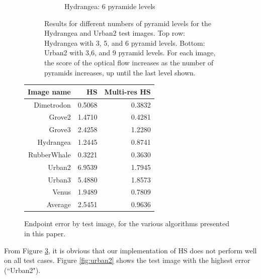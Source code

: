 \documentclass[10pt,twocolumn,letterpaper]{article}
\begin{document}
\begin{figure}
\begin{figure}[t]
\begin{subfigure}[b]{0.3\textwidth}
		\caption{Hydrangea: 6 pyramide levels}
		\label{fig:hydrangea6}
	\end{subfigure}
	\caption{Results for different numbers of pyramid levels for the Hydrangea and Urban2 test images.  Top row: Hydrangea with 3, 5, and 6 pyramid levels.  Bottom: Urban2 with 3,6, and 9 pyramid levels. For each image, the score of the optical flow increases as the number of pyramids increases, up until the last level shown. }
	\label{fig:multires}
\end{figure}

\begin{tabular} {|r | r | r|}
\hline
Image name & HS & Multi-res HS \\
\hline 
Dimetrodon & 0.5068 &  0.3832 \\
Grove2 & 1.4710 & 0.4281 \\
Grove3 &  2.4258 & 1.2280 \\
Hydrangea & 1.2445 & 0.8741 \\
RubberWhale & 0.3221 & 0.3630 \\
Urban2 & 6.9539 & 1.7945 \\
Urban3 & 5.4880 & 1.8573 \\
Venus & 1.9489 & 0.7809 \\
\hline
Average & 2.5451 & 0.9636 \\
\hline

\end{tabular}

\caption{Endpoint error by test image, for the various algorithms presented in this paper.}
\label{fig:table}
\end{figure}

From Figure \ref{fig:table}, it is obvious that our implementation of HS does not perform well on all test cases.  Figure \ref{fig:urban2} shows the test image with the highest error (``Urban2").
\end{document}
